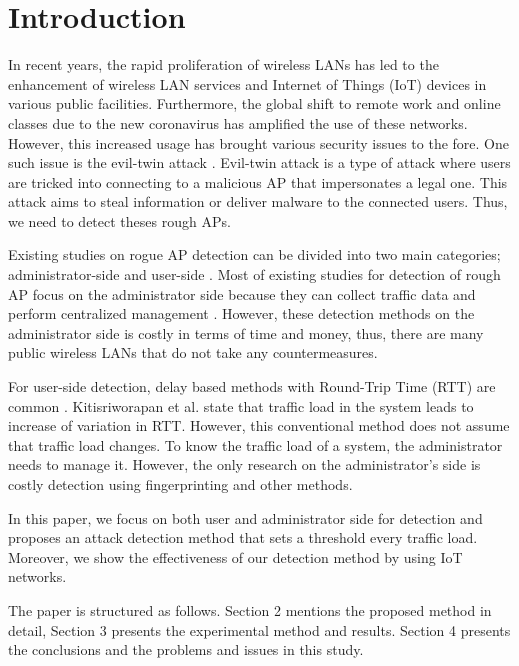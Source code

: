 \documentclass[conference]{IEEEtran}
\begin{document}
\section{Introduction}
In recent years, the rapid proliferation of wireless LANs has led to the enhancement of wireless LAN services and Internet of Things (IoT) devices in various public facilities.  Furthermore, the global shift to remote work and online classes due to the new coronavirus has amplified the use of these networks. However, this increased usage has brought various security issues to the fore. One such issue is the evil-twin attack \cite{2021evil}. Evil-twin attack is a type of attack where users are tricked into connecting to a malicious AP that impersonates a legal one. This attack aims to steal information or deliver malware to the connected users. Thus, we need to detect theses rough APs. \par
Existing studies on rogue AP detection can be divided into two main categories; administrator-side \cite{9339980,9231042,9222455} and user-side \cite{5062077,8955158,9405821}. Most of existing studies for detection of rough AP focus on the administrator side \cite{9339980, 9231042} because they can collect traffic data and perform centralized management \cite{9339980}. However, these detection methods on the administrator side is costly in terms of time and money, thus, there are many public wireless LANs that do not take any countermeasures.\par
For user-side detection, delay based methods with Round-Trip Time (RTT) are common \cite{5062077,8955158,9405821}. Kitisriworapan et al. \cite{9405821} state that traffic load in the system leads to increase of variation in RTT. However, this conventional method does not assume that traffic load changes. To know the traffic load of a system, the administrator needs to manage it. However, the only research on the administrator's side is costly detection using fingerprinting and other methods.\par
In this paper, we focus on both user and administrator side for detection and proposes an attack detection method that sets a threshold every traffic load. Moreover, we show the effectiveness of our detection method by using IoT networks. \par
The paper is structured as follows. Section 2 mentions the proposed method in detail, Section 3 presents the experimental method and results. Section 4 presents the conclusions and the problems and issues in this study.
\end{document}

